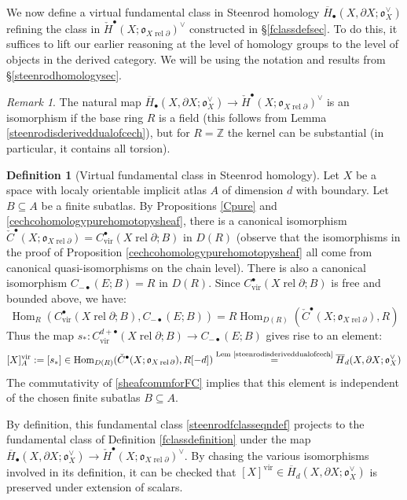 \documentclass[12pt]{article}
\theoremstyle{definition}
\newtheorem{definition}[theorem]{Definition}
\theoremstyle{remark}
\newtheorem{remark}[theorem]{Remark}
\numberwithin{equation}{subsection}
\newcommand{\oo}{\mathfrak o}
\newcommand{\ZZ}{\mathbb Z}
\newcommand{\cH}{\check H}
\newcommand{\sH}{\overline H}
\newcommand{\cC}{\check C}
\newcommand{\Hom}{\operatorname{Hom}}
\newcommand{\vir}{\mathrm{vir}}
\newcommand{\rel}{\operatorname{rel}}
\begin{document}
We now define a virtual fundamental class in Steenrod homology $\sH_\bullet(X,\partial X;\oo_X^\vee)$ refining the class in $\cH^\bullet(X;\oo_{X\rel\partial})^\vee$ constructed in \S\ref{fclassdefsec}.  To do this, it suffices to lift our earlier reasoning at the level of homology groups to the level of objects in the derived category.  We will be using the notation and results from \S\ref{steenrodhomologysec}.

\begin{remark}
The natural map $\sH_\bullet(X,\partial X;\oo_X^\vee)\to\cH^\bullet(X;\oo_{X\rel\partial})^\vee$ is an isomorphism if the base ring $R$ is a field (this follows from Lemma \ref{steenrodisderiveddualofcech}), but for $R=\ZZ$ the kernel can be substantial (in particular, it contains all torsion).
\end{remark}

\begin{definition}[Virtual fundamental class in Steenrod homology]
Let $X$ be a space with localy orientable implicit atlas $A$ of dimension $d$ with boundary.  Let $B\subseteq A$ be a finite subatlas.  By Propositions \ref{Cpure} and \ref{cechcohomologypurehomotopysheaf}, there is a canonical isomorphism $\cC^\bullet(X;\oo_{X\rel\partial})=C_\vir^\bullet(X\rel\partial;B)$ in $D(R)$ (observe that the isomorphisms in the proof of Proposition \ref{cechcohomologypurehomotopysheaf} all come from canonical quasi-isomorphisms on the chain level).  There is also a canonical isomorphism $C_{-\bullet}(E;B)=R$ in $D(R)$.    Since $C_\vir^\bullet(X\rel\partial;B)$ is free and bounded above, we have:
\begin{equation}
\Hom_R(C_\vir^\bullet(X\rel\partial;B),C_{-\bullet}(E;B))=R\Hom_{D(R)}(\cC^\bullet(X;\oo_{X\rel\partial}),R)
\end{equation}
Thus the map $s_\ast:C_\vir^{d+\bullet}(X\rel\partial;B)\to C_{-\bullet}(E;B)$ gives rise to an element:
\begin{equation}\label{steenrodfclasseqndef}
[X]^\vir_A:=[s_\ast]\in\Hom_{D(R)}(\cC^\bullet(X;\oo_{X\rel\partial}),R[-d])\overset{\text{Lem \ref{steenrodisderiveddualofcech}}}=\sH_d(X,\partial X;\oo_X^\vee)
\end{equation}
The commutativity of \eqref{sheafcommforFC} implies that this element is independent of the chosen finite subatlas $B\subseteq A$.

By definition, this fundamental class \eqref{steenrodfclasseqndef} projects to the fundamental class of Definition \ref{fclassdefinition} under the map $\sH_\bullet(X,\partial X;\oo_X^\vee)\to\cH^\bullet(X;\oo_{X\rel\partial})^\vee$.  By chasing the various isomorphisms involved in its definition, it can be checked that $[X]^\vir\in\sH_d(X,\partial X;\oo_X^\vee)$ is preserved under extension of scalars.
\end{definition}
\end{document}
